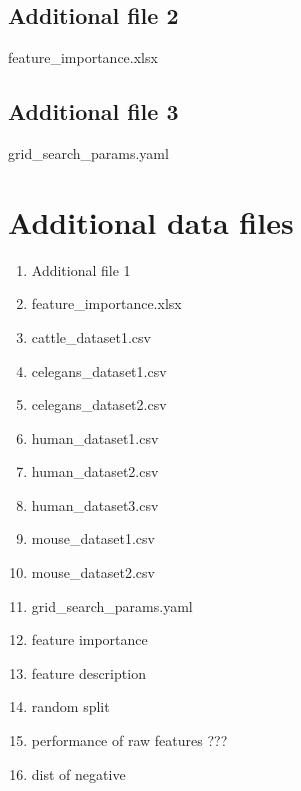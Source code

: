 \documentclass{bmcart}
\begin{document}
\begin{backmatter}
  \subsection*{Additional file 2}  \label{add:feature importance}
    feature_importance.xlsx
 
 \subsection*{Additional file 3}  \label{add:hyperoptparams}
   grid_search_params.yaml




\section*{Additional data files}




\begin{enumerate}
\item Additional file 1
\item feature_importance.xlsx
\item cattle\_dataset1.csv
\item celegans\_dataset1.csv
\item celegans\_dataset2.csv
\item human\_dataset1.csv
\item human\_dataset2.csv
\item human\_dataset3.csv
\item mouse\_dataset1.csv
\item mouse\_dataset2.csv
\item grid\_search\_params.yaml
\item feature importance 
\item feature description
\item random split
\item performance of raw features ???
\item dist of negative


\end{enumerate}




\end{backmatter}
\end{document}
